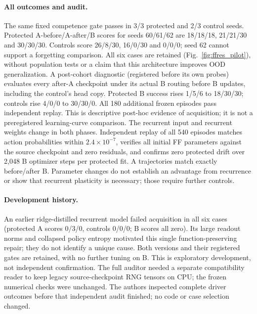 \documentclass[10pt,onecolumn,letterpaper]{article}
\begin{document}
\paragraph{All outcomes and audit.}
The same fixed competence gate passes in 3/3 protected and 2/3 control seeds. Protected A-before/A-after/B
scores for seeds 60/61/62 are 18/18/18, 21/21/30 and 30/30/30. Controls score 26/8/30, 16/0/30 and 0/0/0;
seed 62 cannot support a forgetting comparison. All six cases are retained (Fig.~\ref{fig:ffres_pilot}),
without population tests or a claim that this architecture improves OOD generalization.
A post-cohort diagnostic (registered before its own probes) evaluates every after-A checkpoint under its actual
B routing before B updates, including the control's head copy. Protected B success rises 1/5/6 to 18/30/30;
controls rise 4/0/0 to 30/30/0. All 180 additional frozen episodes pass independent replay. This is descriptive
post-hoc evidence of acquisition; it is not a preregistered learning-curve comparison.
The recurrent input and recurrent weights change in both phases. Independent replay of all 540 episodes
matches action probabilities within $2.4\times10^{-7}$, verifies all initial FF parameters against the source
checkpoint and zero residuals, and confirms zero protected drift over 2,048 B optimizer steps per protected fit.
A trajectories match exactly before/after B. Parameter changes do not establish an advantage from recurrence
or show that recurrent plasticity is necessary; those require further controls.

\paragraph{Development history.}
An earlier ridge-distilled recurrent model failed acquisition in all six cases (protected A scores 0/3/0,
controls 0/0/0; B scores all zero). Its large readout norms and collapsed policy entropy motivated this single
function-preserving repair; they do not identify a unique cause. Both versions and their registered gates
are retained, with no further tuning on B. This is exploratory development, not independent confirmation.
The full auditor needed a separate compatibility reader to keep legacy source-checkpoint RNG tensors on CPU;
the frozen numerical checks were unchanged. The authors inspected complete driver outcomes before that
independent audit finished; no code or case selection changed.
\end{document}

